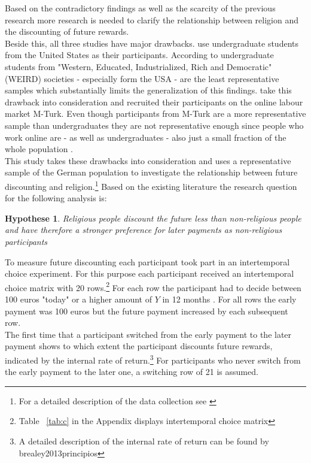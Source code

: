 \documentclass[10pt,a4paper]{article}
\newtheorem{hyp}{Hypothese}
\begin{document}
Based on the contradictory findings as well as the scarcity of the previous research more research is needed to clarify the relationship between religion and the discounting of future rewards.\\
Beside this, all three studies have major drawbacks. \textcite{carter2012religious, benjamin2010religious} use undergraduate students from the United States as their participants. According to \textcite{henrich2010weirdest} undergraduate students from "Western, Educated, Industrialized, Rich and Democratic" (WEIRD) societies - especially form the USA - are the least representative samples which substantially limits the generalization of this findings. \textcite{thornton2015divine} take this drawback into consideration and recruited their participants on the online labour market M-Turk. Even though participants from M-Turk are a more representative sample than undergraduates they are not representative enough since people who work online are - as well as undergraduates - also just a small fraction of the whole population \parencite{horton2011online}.\\

This study takes these drawbacks into consideration and uses a representative sample of the German population to investigate the relationship between future discounting and religion.\footnote{For a detailed description of the data collection see \textcite{dohmen2010risk}}
Based on the existing literature the research question for the following analysis is: 
\begin{hyp}
Religious people discount the future less than non-religious people and have therefore a stronger preference for later payments as non-religious participants
\end{hyp}

To measure future discounting each participant took part in an intertemporal choice experiment. For this purpose each participant received an intertemporal choice matrix with 20 rows.\footnote{Table ~\ref{tab:c} in the Appendix displays intertemporal choice matrix} For each row the participant had to decide between 100 euros "today" or a higher amount of $Y$ in 12 months \parencite{dohmen2010risk}. For all rows the early payment was 100 euros but the future payment increased by each subsequent row.\\
The first time that a participant switched from the early payment to the later payment shows to which extent the participant discounts future rewards, indicated by the internal rate of return.\footnote{A detailed description of the internal rate of return can be found by brealey2013principios} For participants who never switch from the early payment to the later one, a switching row of 21 is assumed.\\  
\end{document}
